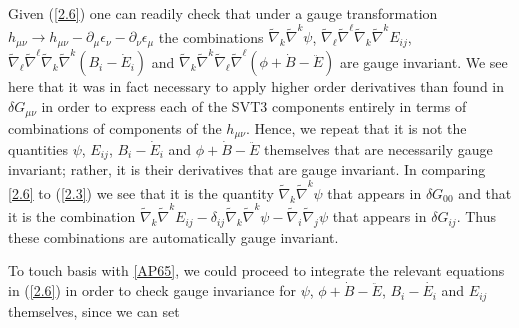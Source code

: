 %
Given (\ref{2.6}) one can readily check that under a gauge transformation $h_{\mu\nu}\rightarrow h_{\mu\nu}-\partial_{\mu}\epsilon_{\nu}-\partial_{\nu}\epsilon_{\mu}$ the combinations  $\tilde{\nabla}_k\tilde{\nabla}^k\psi $, $\tilde{\nabla}_{\ell}\tilde{\nabla}^{\ell}\tilde{\nabla}_k\tilde{\nabla}^kE_{ij}$, $\tilde{\nabla}_{\ell}\tilde{\nabla}^{\ell}\tilde{\nabla}_k\tilde{\nabla}^k(B_i-\dot{E}_i)$ and $ \tilde{\nabla}_k\tilde{\nabla}^k\tilde{\nabla}_{\ell}\tilde{\nabla}^{\ell}(\phi+\dot{B}-\ddot{E})$ are gauge invariant. We see here that it was in fact necessary to apply higher order derivatives than found in $\delta G_{\mu\nu}$ in order to express each of the SVT3 components entirely in terms of combinations of components of the $h_{\mu\nu}$. Hence, we repeat that it is not the quantities $\psi$, $E_{ij}$, $B_i-\dot{E}_i$ and $\phi+\dot{B}-\ddot{E}$ themselves that are necessarily gauge invariant; rather, it is their derivatives that are  gauge invariant. In comparing \eqref{2.6} to (\ref{2.3}) we see that it is the quantity $\tilde{\nabla}_k\tilde{\nabla}^k\psi$ that appears in $\delta G_{00}$ and that it is the combination $ \tilde{\nabla}_k\tilde{\nabla}^kE_{ij}-\delta_{ij}\tilde{\nabla}_k\tilde{\nabla}^k\psi-\tilde{\nabla}_i\tilde{\nabla}_j\psi$ that appears in  $\delta G_{ij}$. Thus these  combinations are automatically gauge invariant.

To touch basis with \eqref{AP65}, we could proceed to integrate the relevant equations in (\ref{2.6}) in order to check gauge invariance for $\psi$, $\phi+\dot{B}-\ddot{E}$, $B_{i}-\dot{E_i}$ and $E_{ij}$ themselves, since we can set

